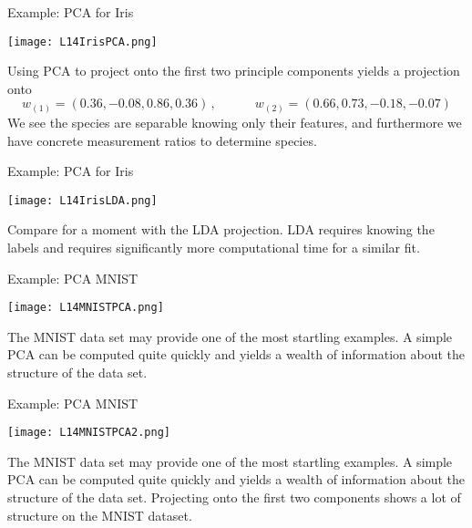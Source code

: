 \documentclass[10pt, table, dvipsnames,xcdraw,handout]{beamer}
\begin{document}
\begin{frame}[fragile]{Example: PCA for Iris}
  \begin{minipage}[t][0.5\textheight][t]{\textwidth}
	\centering \texttt{[image: L14IrisPCA.png]} 
  \end{minipage}
  \vfill
\begin{minipage}[t][0.5\textheight][t]{\textwidth}
Using PCA to project onto the first two principle components yields a projection onto 
$$
w_{(1)} = (0.36, -0.08,  0.86,  0.36)\,,\hspace{3em} w_{(2)} = (0.66,  0.73, -0.18 , -0.07)
$$\pause
We see the species are separable knowing only their features, and furthermore we have concrete measurement ratios to determine species.
\end{minipage}
\end{frame}





\begin{frame}[fragile]{Example: PCA for Iris}
  \begin{minipage}[t][0.5\textheight][t]{\textwidth}
	\centering \texttt{[image: L14IrisLDA.png]} 
  \end{minipage}
  \vfill
\begin{minipage}[t][0.5\textheight][t]{\textwidth}
Compare for a moment with the LDA projection. LDA requires knowing the labels and requires significantly more computational time for a similar fit. 
\end{minipage}
\end{frame}




\begin{frame}[fragile]{Example: PCA MNIST}
  \begin{minipage}[t][0.5\textheight][t]{\textwidth}
	\centering \texttt{[image: L14MNISTPCA.png]} 
  \end{minipage}
  \vfill
\begin{minipage}[t][0.5\textheight][t]{\textwidth}
The MNIST data set may provide one of the most startling examples. A simple PCA can be computed quite quickly and yields a wealth of information about the structure of the data set. 
\end{minipage}
\end{frame}


\begin{frame}[fragile]{Example: PCA MNIST}
  \begin{minipage}[t][0.5\textheight][t]{\textwidth}
	\centering \texttt{[image: L14MNISTPCA2.png]} 
  \end{minipage}
  \vfill
\begin{minipage}[t][0.5\textheight][t]{\textwidth}
The MNIST data set may provide one of the most startling examples. A simple PCA can be computed quite quickly and yields a wealth of information about the structure of the data set. Projecting onto the first two components shows a lot of structure on the MNIST dataset. 
\end{minipage}
\end{frame}
\end{document}
